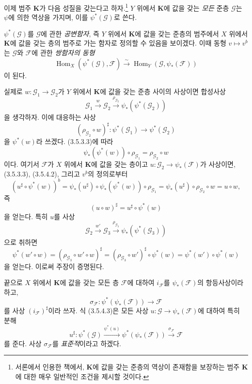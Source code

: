 \begin{env}[3.5.4]
\label{0.3.5.4-ko}
이제 범주 $\mathbf K$가 다음 성질을 갖는다고 하자.\footnote{서론에서 인용한 책에서, $\mathbf K$에 값을 갖는 준층의 역상이 존재함을 보장하는 범주 $\mathbf K$에 대한 매우 일반적인 조건을 제시할 것이다.} $Y$ 위에서 $\mathbf K$에 값을 갖는 \emph{모든} 준층 $\mathcal G$는 $\psi$에 의한 역상을 가지며, 이를 $\psi^*(\mathcal G)$로 쓴다.

$\psi^*(\mathcal G)$를 $\mathcal G$에 관한 \emph{공변함자}, 즉 $Y$ 위에서 $\mathbf K$에 값을 갖는 준층의 범주에서 $X$ 위에서 $\mathbf K$에 값을 갖는 층의 범주로 가는 함자로 정의할 수 있음을 보이겠다. 이때 동형 $v\mapsto v^b$는 $\mathcal G$와 $\mathcal F$에 관한 \emph{쌍함자의 동형}
\begin{equation*}
  \operatorname{Hom}_X(\psi^*(\mathcal G),\mathcal F)
  \xrightarrow{\sim}
  \operatorname{Hom}_Y(\mathcal G,\psi_*(\mathcal F))
\tag{3.5.4.1}\label{0.3.5.4.1-ko}
\end{equation*}
이 된다.

실제로 $w:\mathcal G_1\to\mathcal G_2$가 $Y$ 위에서 $\mathbf K$에 값을 갖는 준층 사이의 사상이면 합성사상
\[
  \mathcal G_1\xrightarrow{w}\mathcal G_2
  \xrightarrow{\rho_{\mathcal G_2}}
  \psi_*(\psi^*(\mathcal G_2))
\]
을 생각하자. 이에 대응하는 사상
\[
  (\rho_{\mathcal G_2}\circ w)^\sharp:
  \psi^*(\mathcal G_1)\longrightarrow\psi^*(\mathcal G_2)
\]
을 $\psi^*(w)$라 쓰겠다. (3.5.3.3)에 따라
\begin{equation*}
  \psi_*(\psi^*(w))\circ\rho_{\mathcal G_1}
  =\rho_{\mathcal G_2}\circ w
\tag{3.5.4.2}\label{0.3.5.4.2-ko}
\end{equation*}
이다. 여기서 $\mathcal F$가 $X$ 위에서 $\mathbf K$에 값을 갖는 층이고 $u:\mathcal G_2\to\psi_*(\mathcal F)$가 사상이면, (3.5.3.3), (3.5.4.2), 그리고 $v^b$의 정의로부터
\[
  (u^\sharp\circ\psi^*(w))^b
  =\psi_*(u^\sharp)\circ\psi_*(\psi^*(w))\circ\rho_{\mathcal G_1}
  =\psi_*(u^\sharp)\circ\rho_{\mathcal G_2}\circ w
  =u\circ w,
\]
즉
\begin{equation*}
  (u\circ w)^\sharp=u^\sharp\circ\psi^*(w)
\tag{3.5.4.3}\label{0.3.5.4.3-ko}
\end{equation*}
을 얻는다. 특히 $u$를 사상
\[
  \mathcal G_2\xrightarrow{w'}\mathcal G_3
  \xrightarrow{\rho_{\mathcal G_3}}
  \psi_*(\psi^*(\mathcal G_3))
\]
으로 취하면
\[
  \psi^*(w'\circ w)
  =(\rho_{\mathcal G_3}\circ w'\circ w)^\sharp
  =(\rho_{\mathcal G_3}\circ w')^\sharp\circ\psi^*(w)
  =\psi^*(w')\circ\psi^*(w)
\]
을 얻는다. 이로써 주장이 증명된다.

끝으로 $X$ 위에서 $\mathbf K$에 값을 갖는 모든 층 $\mathcal F$에 대하여 $i_{\mathcal F}$를 $\psi_*(\mathcal F)$의 항등사상이라 하고,
\[
  \sigma_{\mathcal F}:
  \psi^*(\psi_*(\mathcal F))\longrightarrow\mathcal F
\]
를 사상 $(i_{\mathcal F})^\sharp$이라 쓰자. 식 (3.5.4.3)은 모든 사상 $u:\mathcal G\to\psi_*(\mathcal F)$에 대하여 특히 분해
\begin{equation*}
  u^\sharp:\psi^*(\mathcal G)
  \xrightarrow{\psi^*(u)}
  \psi^*(\psi_*(\mathcal F))
  \xrightarrow{\sigma_{\mathcal F}}\mathcal F
\tag{3.5.4.4}\label{0.3.5.4.4-ko}
\end{equation*}
를 준다. 사상 $\sigma_{\mathcal F}$를 \emph{표준적}이라고 하겠다.
\end{env}

